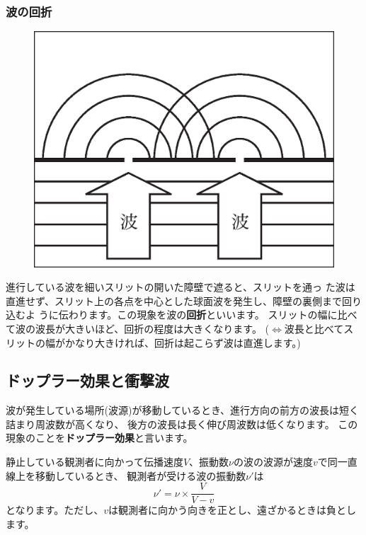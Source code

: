 \subsubsection{波の回折}

\begin{figure}
\vspace*{-0.8cm}
\includegraphics[scale=0.38]{01_Wave/diffraction.eps}
\end{figure}

進行している波を細いスリットの開いた障壁で遮ると、スリットを通っ
た波は直進せず、スリット上の各点を中心とした球面波を発生し、障壁の裏側まで回り込むよ 
うに伝わります。この現象を波の{\bf 回折}といいます。
スリットの幅に比べて波の波長が大きいほど、回折の程度は大きくなります。
($\Leftrightarrow$波長と比べてスリットの幅がかなり大きければ、回折は起こらず波は直進します。)

\subsection{ドップラー効果と衝撃波}

波が発生している場所(波源)が移動しているとき、進行方向の前方の波長は短く詰まり周波数が高くなり、
後方の波長は長く伸び周波数は低くなります。
この現象のことを{\bf ドップラー効果}と言います。

静止している観測者に向かって伝播速度$V$、振動数$\nu$の波の波源が速度$v$で同一直線上を移動しているとき、
観測者が受ける波の振動数$\nu'$は
\[
\nu' = \nu \times \frac{V}{V-v}
\]
となります。ただし、$v$は観測者に向かう向きを正とし、遠ざかるときは負とします。

